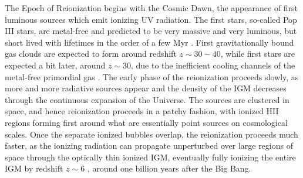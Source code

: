 The Epoch of Reionization begins with the Cosmic Dawn, the appearance of first luminous sources which emit ionizing UV radiation. The first stars, so-called Pop III stars, are metal-free and predicted to be very massive and very luminous, but short lived with lifetimes in the order of a few Myr \citep[e.g.][]{schaererPropertiesMassivePopulation2002}. First gravitationally bound gas clouds are expected to form around redshift $z \sim 30 - 40$, while first stars are expected a bit later, around $z \sim 30$, due to the inefficient cooling channels of the metal-free primordial gas \citep[e.g.][]{gloverFormationFirstStars2005}. The early phase of the reionization proceeds slowly,
as more and more radiative sources appear and the density of the IGM decreases through the
continuous expansion of the Universe. The sources are clustered in space, and hence reionization
proceeds in a patchy fashion, with ionized HII regions forming first around what are essentially
point sources on cosmological scales. Once the separate ionized bubbles overlap, the reionization
proceeds much faster, as the ionizing radiation can propagate unperturbed over large regions of
space through the optically thin ionized IGM, eventually fully ionizing the entire IGM by redshift
$z \sim 6$ \citep{robertsonGalaxyFormationReionization2022}, around one billion years after the Big
Bang.


